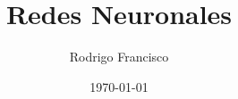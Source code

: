 \makeatletter
\author{Rodrigo Francisco}
\title{Redes Neuronales}
\date{\today}

\newcommand{\university}{Universidad Nacional Autónoma de México}
\newcommand{\faculty}{Facultad de Ingeniería}
\newcommand{\semestre}{2021-1}
\newcommand{\materia}{BDD}
\newcommand{\clave}{294}
\newcommand{\grupo}{1}
\newcommand{\profesor}{Ing. Rodriguez Campos \textsc{Jorge Alberto}}


